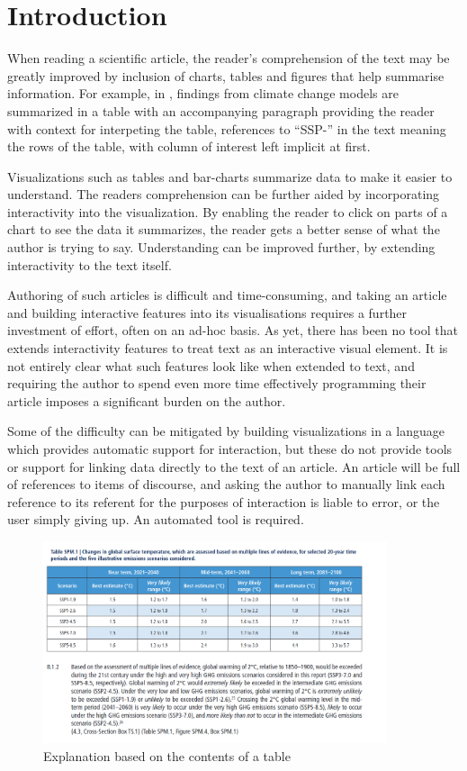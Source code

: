 \section{Introduction}

When reading a scientific article, the reader's comprehension of the text may
be greatly improved by inclusion of charts, tables and figures that help summarise information.
For example, in , findings from climate change models
are summarized in a table with an accompanying paragraph providing the reader
with context for interpeting the table, references to ``SSP-'' in the text meaning
the rows of the table, with column of interest left implicit at first.

Visualizations such as tables and bar-charts summarize data to make it easier to
understand. The readers comprehension can be further aided by incorporating 
interactivity into the visualization. By enabling the reader to click on parts
of a chart to see the data it summarizes, the reader gets a better sense of what
the author is trying to say. Understanding can be improved further, by extending
interactivity to the text itself.

Authoring of such articles is difficult and time-consuming, and taking an article
and building interactive features into its visualisations requires a further investment
of effort, often on an ad-hoc basis. As yet, there has been no tool that extends
interactivity features to treat text as an interactive visual element. It is not
entirely clear what such features look like when extended to text, and requiring
the author to spend even more time effectively programming their article imposes
a significant burden on the author. 

Some of the difficulty can be mitigated by building visualizations in a language
which provides automatic support for interaction, but these do not provide tools
or support for linking data directly to the text of an article. An article will
be full of references to items of discourse, and asking the author to manually
link each reference to its referent for the purposes of interaction is liable to
error, or the user simply giving up. An automated tool is required. 

\begin{figure}
   \includegraphics[width=0.9\textwidth]{fig/ipcc-table-explanation.png}
   \caption{Explanation based on the contents of a table}
   \label{fig:table-explanation}
\end{figure}